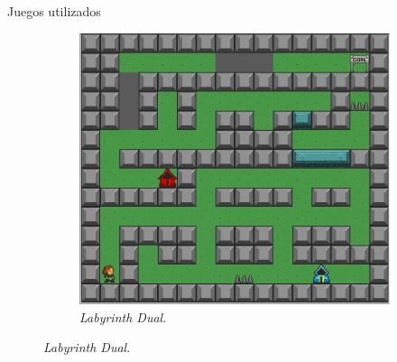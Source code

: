 \documentclass[11pt]{beamer}    %
\begin{document}
\begin{frame}{Juegos utilizados}
\begin{figure}
\begin{subfigure}[t]{0.5\textwidth}
                \centering
                \includegraphics[scale=0.15]{img/presentation/labyrinth_dual.png}
                \caption{\textit{Labyrinth Dual}.}
            \end{subfigure}
        \end{figure}

    \end{frame}
\end{document}

